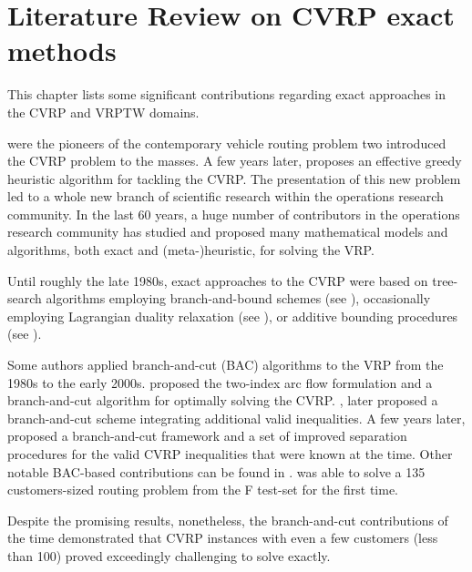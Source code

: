 \chapter{Literature Review on CVRP exact methods}
\label{sec:intro-literature-review}

This chapter lists some significant contributions regarding exact approaches in the CVRP and VRPTW domains.

\textcite{dantzig1959} were
the pioneers of the contemporary vehicle routing problem two
introduced the CVRP problem to the masses.
A few years later, \textcite{clarke1964} proposes
an effective greedy heuristic algorithm for tackling the CVRP.
The presentation of this new problem led to a whole new branch
of scientific research within the operations research community.
In the last 60 years, a huge number of contributors in
the operations research community has studied and proposed many
mathematical models and algorithms, both exact and (meta-)heuristic,
for solving the VRP.

Until roughly the late 1980s, exact approaches to the CVRP were
based on tree-search algorithms employing branch-and-bound schemes
(see \cite{pierce1969, christofides1969, christofides1981exact, laporte1986}),
occasionally employing Lagrangian duality relaxation (see \cite{fisher1994, miller1995}),
or additive bounding procedures (see \cite{fischetti1994a, hadjiconstantinou1995}).

Some authors applied branch-and-cut (BAC) algorithms  to the VRP from the 1980s to the early 2000s.
\textcite{laporte1983, laporte1985} proposed the two-index arc flow formulation
and a branch-and-cut algorithm for optimally solving the CVRP.
\Textcite{augerat1995approche}, later proposed a branch-and-cut scheme
integrating additional valid inequalities.
A few years later, \textcite{lysgaard2004}
proposed a branch-and-cut framework and
a set of improved separation procedures for the valid CVRP inequalities that were known at the time.
Other notable BAC-based contributions
can be found in \textcite{araqueg1994, augerat1995, achuthan1996, blasum2000, ralphs2003, achuthan2003, baldacci2004}.
\citeauthor{baldacci2004} was able to solve a 135 customers-sized routing problem
from the F test-set  \textcite{fisher1994}
for the first time.

Despite the promising results, nonetheless,
the branch-and-cut contributions of the time demonstrated
that CVRP instances with even a few customers (less than 100)
proved exceedingly challenging to solve exactly.

